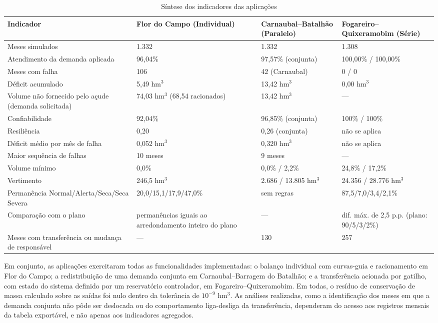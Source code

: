 \begin{table}[!htbp]
    \captionsetup{width=15cm}
    \caption{Síntese dos indicadores das aplicações}
    \label{tab:sintese}
    \centering
    \scriptsize
    \begin{tabular}{p{3.4cm}p{3.2cm}p{3.6cm}p{3.6cm}}
        \toprule
        Indicador & Flor do Campo (Individual) & Carnaubal--Batalhão (Paralelo) & Fogareiro--Quixeramobim (Série) \\
        \midrule
        Meses simulados & 1.332 & 1.332 & 1.308 \\
        Atendimento da demanda aplicada & 96,04\% & 97,57\% (conjunta) & 100,00\% / 100,00\% \\
        Meses com falha & 106 & 42 (Carnaubal) & 0 / 0 \\
        Déficit acumulado & 5,49 hm$^3$ & 13,42 hm$^3$ & 0,00 hm$^3$ \\
        Volume não fornecido pelo açude (demanda solicitada) & 74,03 hm$^3$ (68,54 racionados) & 13,42 hm$^3$ & --- \\
        Confiabilidade & 92,04\% & 96,85\% (conjunta) & 100\% / 100\% \\
        Resiliência & 0,20 & 0,26 (conjunta) & não se aplica \\
        Déficit médio por mês de falha & 0,052 hm$^3$ & 0,320 hm$^3$ & não se aplica \\
        Maior sequência de falhas & 10 meses & 9 meses & --- \\
        Volume mínimo & 0,0\% & 0,0\% / 2,2\% & 24,8\% / 17,2\% \\
        Vertimento & 246,5 hm$^3$ & 2.686 / 13.805 hm$^3$ & 24.356 / 28.776 hm$^3$ \\
        Permanência Normal/Alerta/Seca/Seca Severa & 20,0/15,1/17,9/47,0\% & sem regras & 87,5/7,0/3,4/2,1\% \\
        Comparação com o plano & permanências iguais ao arredondamento inteiro do plano & --- & dif. máx. de 2,5 p.p. (plano: 90/5/3/2\%) \\
        Meses com transferência ou mudança de responsável & --- & 130 & 257 \\
        \bottomrule
    \end{tabular}
\end{table}

Em conjunto, as aplicações exercitaram todas as funcionalidades implementadas: o balanço individual com curvas-guia e racionamento em Flor do Campo; a redistribuição de uma demanda conjunta em Carnaubal--Barragem do Batalhão; e a transferência acionada por gatilho, com estado do sistema definido por um reservatório controlador, em Fogareiro--Quixeramobim. Em todas, o resíduo de conservação de massa calculado sobre as saídas foi nulo dentro da tolerância de $10^{-9}$ hm$^3$. As análises realizadas, como a identificação dos meses em que a demanda conjunta não pôde ser deslocada ou do comportamento liga-desliga da transferência, dependeram do acesso aos registros mensais da tabela exportável, e não apenas aos indicadores agregados.

